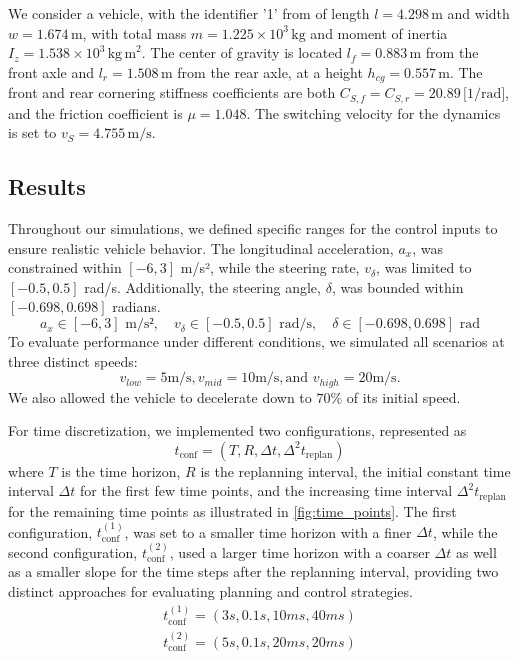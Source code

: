 We consider a vehicle, with the identifier '1' from \cite{noauthor_dateien_2021} of length \(l = 4.298\,\mathrm{m}\) and width \(w =
1.674\,\mathrm{m}\), with total mass \(m = 1.225\times10^3\,\mathrm{kg}\) and moment of inertia \(I_z = 1.538\times10^3\,\mathrm{kg\,m}^2\).
The center of gravity is located \(l_f = 0.883\,\mathrm{m}\) from the front axle and \(l_r = 1.508\,\mathrm{m}\) from the rear axle, at a height
\(h_{cg} = 0.557\,\mathrm{m}\).
The front and rear cornering stiffness coefficients are both \(C_{S,f} = C_{S,r} = 20.89\,\text{[1/rad]}\), and the friction coefficient is \(\mu =
1.048\).
The switching velocity for the dynamics is set to \(v_S = 4.755\,\mathrm{m/s}\).

\subsection{Results}
\label{subsec:results}

Throughout our simulations, we defined specific ranges for the control inputs to ensure realistic vehicle behavior.
The longitudinal acceleration, $a_x$, was constrained within $[-6, 3]$ m/s², while the steering rate, $v_\delta$, was limited to $[-0.5, 0.5]$ rad/s.
Additionally, the steering angle, $\delta$, was bounded within $[-0.698, 0.698]$ radians.
\[
	a_x \in [-6, 3] \text{ m/s²}, \quad v_\delta \in [-0.5, 0.5] \text{ rad/s}, \quad \delta \in [-0.698, 0.698] \text{ rad}
\]
To evaluate performance under different conditions, we simulated all scenarios at three distinct speeds:
\[
	v_{low}=5 \text{m/s}, v_{mid}=10 \text{m/s}, \text{and } v_{high}=20 \text{m/s}.
\]
We also allowed the vehicle to decelerate down to $70\%$ of its initial speed.

For time discretization, we implemented two configurations, represented as \[ t_{\text{conf}} = (T, R, \Delta t, \Delta^2 t_{\text{replan}}) \] where
$T$ is the time horizon, $R$ is the replanning interval, the initial constant time interval $\Delta t$ for the first few time points, and the
increasing time interval $\Delta^2 t_{\text{replan}}$ for the remaining time points as illustrated in \ref{fig:time_points}.
The first configuration, $t_{\text{conf}}^{(1)}$, was set to a smaller time horizon with a finer $\Delta t$, while the second configuration,
$t_{\text{conf}}^{(2)}$, used a larger time horizon with a coarser $\Delta t$ as well as a smaller slope for the time steps after the replanning
interval, providing two distinct approaches for evaluating planning and control strategies.
\begin{align*}
	t_{\text{conf}}^{(1)} = (3s, 0.1s, 10ms, 40ms) \\
	t_{\text{conf}}^{(2)} = (5s, 0.1s, 20ms, 20ms)
\end{align*}


